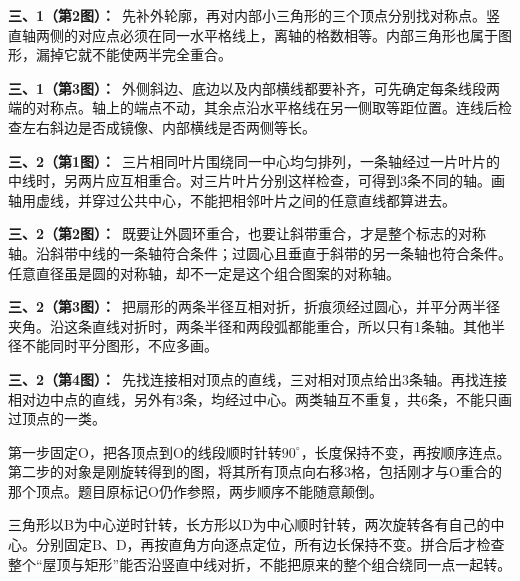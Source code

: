 \documentclass[multi=snippet,border=0pt]{standalone}
\newenvironment{snippet}[3]{\begin{minipage}{#1bp}\color{answerred}\fontsize{#2}{#3}\selectfont\raggedright}{\end{minipage}}
\begin{document}
\begin{snippet}{505}{11.5}{14}\textbf{三、1（第2图）：}\ 先补外轮廓，再对内部小三角形的三个顶点分别找对称点。竖直轴两侧的对应点必须在同一水平格线上，离轴的格数相等。内部三角形也属于图形，漏掉它就不能使两半完全重合。\end{snippet}
\begin{snippet}{505}{11.5}{14}\textbf{三、1（第3图）：}\ 外侧斜边、底边以及内部横线都要补齐，可先确定每条线段两端的对称点。轴上的端点不动，其余点沿水平格线在另一侧取等距位置。连线后检查左右斜边是否成镜像、内部横线是否两侧等长。\end{snippet}
\begin{snippet}{505}{11.5}{14}\textbf{三、2（第1图）：}\ 三片相同叶片围绕同一中心均匀排列，一条轴经过一片叶片的中线时，另两片应互相重合。对三片叶片分别这样检查，可得到3条不同的轴。画轴用虚线，并穿过公共中心，不能把相邻叶片之间的任意直线都算进去。\end{snippet}
\begin{snippet}{505}{11.5}{14}\textbf{三、2（第2图）：}\ 既要让外圆环重合，也要让斜带重合，才是整个标志的对称轴。沿斜带中线的一条轴符合条件；过圆心且垂直于斜带的另一条轴也符合条件。任意直径虽是圆的对称轴，却不一定是这个组合图案的对称轴。\end{snippet}
\begin{snippet}{505}{11.5}{14}\textbf{三、2（第3图）：}\ 把扇形的两条半径互相对折，折痕须经过圆心，并平分两半径夹角。沿这条直线对折时，两条半径和两段弧都能重合，所以只有1条轴。其他半径不能同时平分图形，不应多画。\end{snippet}
\begin{snippet}{505}{11.5}{14}\textbf{三、2（第4图）：}\ 先找连接相对顶点的直线，三对相对顶点给出3条轴。再找连接相对边中点的直线，另外有3条，均经过中心。两类轴互不重复，共6条，不能只画过顶点的一类。\end{snippet}
\begin{snippet}{505}{11.5}{14}第一步固定O，把各顶点到O的线段顺时针转\(90^\circ\)，长度保持不变，再按顺序连点。第二步的对象是刚旋转得到的图，将其所有顶点向右移3格，包括刚才与O重合的那个顶点。题目原标记O仍作参照，两步顺序不能随意颠倒。\end{snippet}
\begin{snippet}{505}{11.5}{14}三角形以B为中心逆时针转，长方形以D为中心顺时针转，两次旋转各有自己的中心。分别固定B、D，再按直角方向逐点定位，所有边长保持不变。拼合后才检查整个“屋顶与矩形”能否沿竖直中线对折，不能把原来的整个组合绕同一点一起转。\end{snippet}
\end{document}
